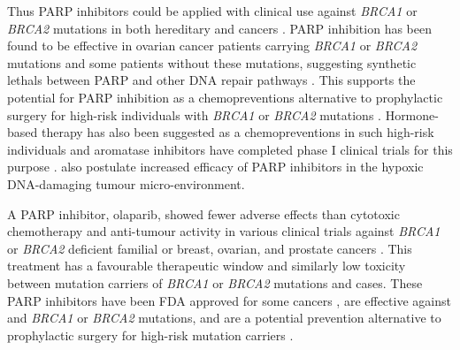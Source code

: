Thus PARP inhibitors could be applied with clinical use against \textit{BRCA1} or \textit{BRCA2} \glspl{mutation} in both \gls{hereditary} and  cancers \citep{Ashworth2008, Kaelin2005}. PARP inhibition has been found to be effective in ovarian cancer patients carrying \textit{BRCA1} or \textit{BRCA2} \glspl{mutation} and some patients without these \glspl{mutation}, suggesting \glspl{synthetic lethal} between PARP and other \acrshort{DNA} repair \glspl{pathway} \citep{Strom2012}. This supports the potential for PARP inhibition as a  \glspl{chemoprevention} alternative to prophylactic surgery for high-risk individuals with \textit{BRCA1} or \textit{BRCA2} \glspl{mutation} \citep{Strom2012}. Hormone-based therapy has also been suggested as a  \glspl{chemoprevention} in such high-risk individuals and aromatase inhibitors have completed phase I clinical trials for this purpose \citep{Bozovic-Spasojevic2012}. \citet{Strom2012} also postulate increased efficacy of PARP inhibitors in the hypoxic \acrshort{DNA}-damaging tumour micro-environment.  

A PARP inhibitor, olaparib, showed fewer adverse effects than cytotoxic \gls{chemotherapy} and anti-tumour activity in various clinical trials against \textit{BRCA1} or \textit{BRCA2} deficient \gls{familial} or  breast, ovarian, and prostate cancers \citep{Fong2009, Fong2010, Tutt2010, Audeh2010}. 
This treatment has a favourable therapeutic window and similarly low toxicity between \gls{mutation} carriers of \textit{BRCA1} or \textit{BRCA2} \glspl{mutation} and  cases. 
These PARP inhibitors have been FDA approved for some cancers \citep{McLachlan2016}, are effective against  and  \textit{BRCA1} or \textit{BRCA2} \glspl{mutation}, and are a potential prevention alternative to prophylactic surgery for high-risk \gls{mutation} carriers \cite{Strom2012}. 

